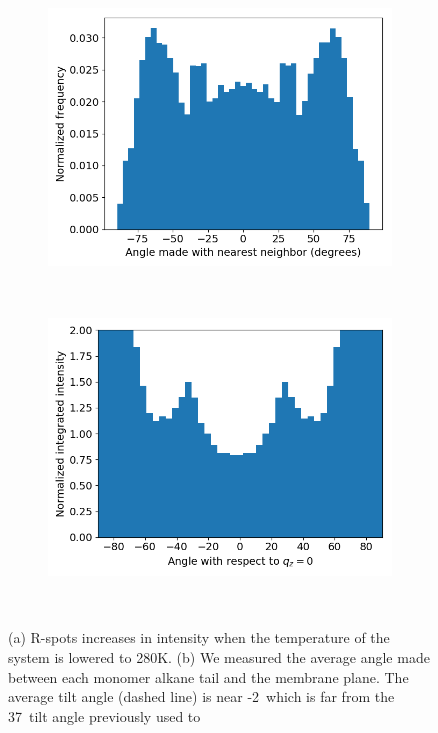 \documentclass[journal=jpcbfk,manuscript=article]{achemso}
\begin{document}
\begin{figure}[!htb]
\begin{subfigure}[t]{0.32\linewidth}
	        \includegraphics[width=\linewidth]{angles_traj_layered.png}
	        \caption{}~\label{fig:layered_tails}
  \end{subfigure}
  \begin{subfigure}[t]{0.32\textwidth}
        	\centering
	        \includegraphics[width=\linewidth]{layered_angle_v_I.png}
	        \caption{}~\label{fig:layered_integration}
  \end{subfigure}
  \caption{(a) R-spots increases in intensity when the temperature of the system is 
      lowered to 280K. (b) We measured the average angle made between each monomer 
      alkane tail and the membrane plane. The average tilt angle (dashed line) is 
      near -2\degree~which is far from the 37\degree~tilt angle previously used to
}
\end{figure}
\end{document}
